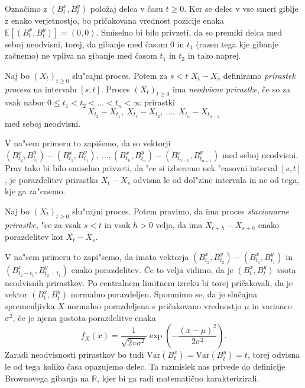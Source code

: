 \documentclass[twoside,11pt]{article}
\begin{document}
\noindent
Označimo z $\left(B^x_{t}, B^y_{t}\right)$ položaj delca v času $t \geq 0$. Ker se delec v vse 
smeri giblje z enako verjetnostjo, bo pričakovana vrednost pozicije enaka $\mathbb{E}\left[(B_t^x, B_t^y)\right] = (0, 0).$
Smiselno bi bilo privzeti, da so premiki delca med seboj neodvisni, torej, 
da gibanje med časom $0$ in $t_1$ (razen tega kje gibanje začnemo) ne vpliva na gibanje med časom $t_1$ in $t_2$ in tako naprej.

\begin{definicija}
    Naj bo $(X_t)_{t\geq0}$ slu"cajni proces. Potem za $s < t$ $X_t - X_s$ definiramo \textit{prirastek procesa} na 
    intervalu $[s, t]$. Proces $(X_t)_{t\geq0}$ ima \textit{neodvisne prirastke}, če so za vsak nabor 
    $0 \leq t_1 < t_2 < \dots < t_n < \infty$ prirastki 
    $$
        X_{t_2} - X_{t_1}, \ X_{t_3} - X_{t_2}, \ \dots, \ X_{t_n} - X_{t_{n-1}}
    $$
    med seboj neodvisni.
\end{definicija}

\noindent
V na"sem primeru to zapišemo, da so vektorji $(B^x_{t_2}, B^y_{t_2}) - (B^x_{t_1}, B^y_{t_1}), \ \dots, (B^x_{t_n}, B^y_{t_n}) - (B^x_{t_{n-1}}, B^y_{t_{n-1}})$
med seboj neodvisni. Prav tako bi bilo smiselno privzeti, da "ce si izberemo nek "casovni interval $[s, t]$,
 je porazdelitev prirastka $X_t - X_s$ odvisna le od dol"zine intervala in ne od tega, kje ga za"cnemo. 

\begin{definicija}
    Naj bo $(X_t)_{t\geq0}$ slu"cajni proces. Potem pravimo, da ima proces \textit{stacionarne prirastke}, "ce za vsak $s < t$ in vsak $h > 0$ velja, da ima $X_{t+h} - X_{s+h}$ enako porazdelitev kot $X_t - X_s$.
\end{definicija}

\noindent
V na"sem primeru to zapi"semo, da imata vektorja $(B^x_{t_2}, B^y_{t_2}) - (B^x_{t_1}, B^y_{t_1})$ in $(B^x_{t_2-t_1}, B^y_{t_2-t_1})$ enako porazdelitev.
Če to velja vidimo, da je $\left(B^x_{t}, B^y_{t}\right)$ vsota neodvisnih prirastkov. Po centralnem 
limitnem izreku bi torej pričakovali, da je vektor $\left(B^x_{t}, B^y_{t}\right)$ normalno porazdeljen.
Spomnimo se, da je slučajna spremenljivka $X$ normalno porazdeljena s pričakovano vrednostjo $\mu$ in varianco $\sigma^2$, če
je njena gostota porazdelitve enaka
$$
    f_X(x) = \frac{1}{\sqrt{2\pi\sigma^2}}\exp\left(-\frac{(x-\mu)^2}{2\sigma^2}\right).
$$
Zaradi neodvisnosti prirastkov bo tudi $\text{Var}(B_t^x) = \text{Var}(B_t^y) = t$, torej odvisna le od tega koliko časa opazujemo delec.
Ta razmislek nas privede do definicije Brownovega gibanja na $\mathbb{R}$, kjer bi ga radi matematično karakterizirali.
\end{document}
